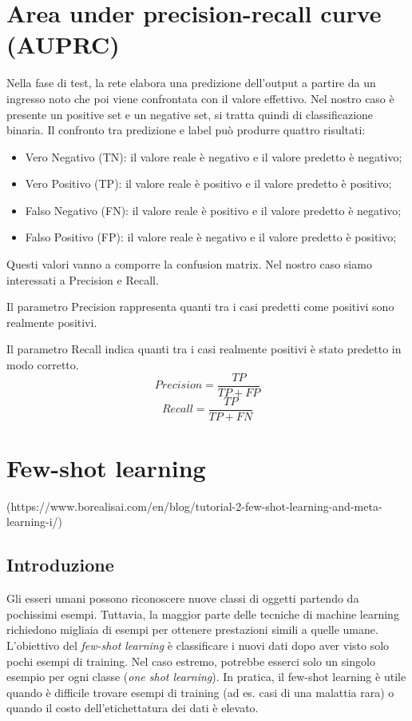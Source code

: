 \documentclass[12pt,a4paper,titlepage]{article}
\begin{document}
\section{Area under precision-recall curve (AUPRC)}
Nella fase di test, la rete elabora una predizione dell'output a partire da un ingresso noto che poi viene confrontata con il valore effettivo.
Nel nostro caso è presente un positive set e un negative set, si tratta quindi di classificazione binaria.
Il confronto tra predizione e label può produrre quattro risultati:
\begin{itemize}
	\item Vero Negativo (TN): il valore reale è negativo e il valore predetto è negativo;
	\item Vero Positivo (TP): il valore reale è positivo e il valore predetto	è positivo;
	\item Falso Negativo (FN): il valore reale è positivo e il valore predetto è negativo;
	\item Falso Positivo (FP): il valore reale è negativo e il valore predetto	è positivo;
\end{itemize}
Questi valori vanno a comporre la confusion matrix.
Nel nostro caso siamo interessati a Precision e Recall.

Il parametro Precision rappresenta quanti tra i casi predetti come positivi sono realmente positivi.

Il parametro Recall indica quanti tra i casi realmente positivi è stato predetto in modo corretto.
\begin{equation}
Precision=\frac{TP}{TP+FP}
\end{equation}
\begin{equation}
Recall=\frac{TP}{TP+FN}
\end{equation}
\section{Few-shot learning}
\label{section:Few-shot}
(https://www.borealisai.com/en/blog/tutorial-2-few-shot-learning-and-meta-learning-i/)
\subsection{Introduzione}
Gli esseri umani possono riconoscere nuove classi di oggetti partendo da pochissimi esempi. Tuttavia, la maggior parte delle tecniche di machine learning richiedono migliaia di esempi per ottenere prestazioni simili a quelle umane. L'obiettivo del \emph{few-shot learning} è classificare i nuovi dati dopo aver visto solo pochi esempi di training. Nel caso estremo, potrebbe esserci solo un singolo esempio per ogni classe (\emph{one shot learning}). In pratica, il few-shot learning è utile quando è difficile trovare esempi di training (ad es. casi di una malattia rara) o quando il costo dell'etichettatura dei dati è elevato.
\end{document}

